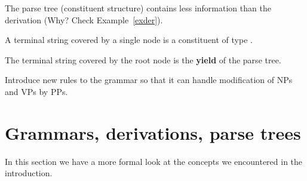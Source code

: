 \documentclass[11pt]{article}
\begin{document}
{\begin{center}
\end{center}

\item The parse tree (constituent structure) contains less information than
the derivation (Why? Check Example~\ref{exder}).
\item A terminal string \sysm{\sigma} covered by a single node  is a
constituent of type .
\item The terminal string covered by the root node is the
\textbf{yield} of the parse tree.

\begin{uexercise}
Introduce new rules to the grammar so that it can handle modification of NPs and
VPs by PPs.
\end{uexercise}
}


\section{Grammars, derivations, parse trees}

In this section we have a more formal look at the concepts we encountered in the
introduction.
	
\end{document}
